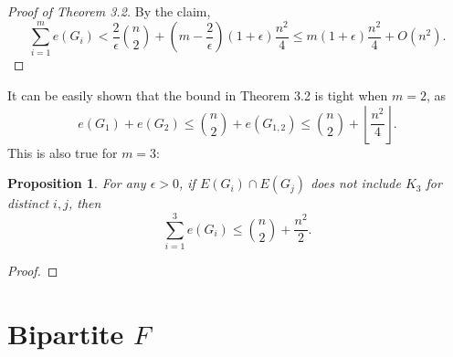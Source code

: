 \documentclass[12pt]{report}
\newtheorem{proposition}[theorem]{Proposition}
\begin{document}
\begin{proof}[Proof of Theorem 3.2]
	By the claim, 
	\[
		\sum_{i = 1}^m e(G_i) < \frac{2}{\epsilon}\binom{n}{2} + \left(m - \frac{2}{\epsilon}\right)(1 + \epsilon)\frac{n^2}{4} \leq m(1 + \epsilon)\frac{n^2}{4} + O(n^2).
	\]
\end{proof}

It can be easily shown that the bound in Theorem 3.2 is tight when $m = 2$, as
\[
	e(G_1) + e(G_2) \leq \binom{n}{2} + e(G_{1, 2}) \leq \binom{n}{2} + \left\lfloor \frac{n^2}{4} \right\rfloor.
\]
This is also true for $m = 3$:

\begin{proposition}
	For any $\epsilon > 0$, if $E(G_i) \cap E(G_j)$ does not include $K_3$ for distinct $i, j$, then
	\[
		\sum_{i = 1}^3 e(G_i) \leq \binom{n}{2} + \frac{n^2}{2}.
	\]
\end{proposition}

\begin{proof}
	
\end{proof}

\section{Bipartite $F$}
\end{document}
